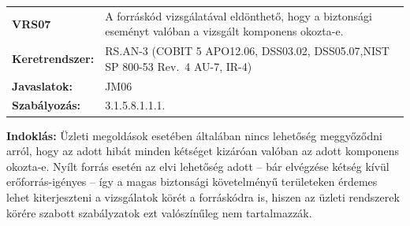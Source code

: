 \documentclass[12pt,magyar,a4paper,oneside]{scrreprt}
\begin{document}
\begin{longtable}[]{@{}ll@{}}
\toprule
\endhead
\begin{minipage}[t]{0.16\columnwidth}\raggedright
\textbf{VRS07}\strut
\end{minipage} & \begin{minipage}[t]{0.79\columnwidth}\raggedright
A forráskód vizsgálatával eldönthető, hogy a biztonsági eseményt valóban
a vizsgált komponens okozta-e.\strut
\end{minipage}\tabularnewline
\begin{minipage}[t]{0.16\columnwidth}\raggedright
\textbf{Keretrendszer:}\strut
\end{minipage} & \begin{minipage}[t]{0.79\columnwidth}\raggedright
RS.AN-3 (COBIT 5 APO12.06, DSS03.02, DSS05.07,NIST SP 800-53 Rev.~4
AU-7, IR-4)\strut
\end{minipage}\tabularnewline
\begin{minipage}[t]{0.16\columnwidth}\raggedright
\textbf{Javaslatok:}\strut
\end{minipage} & \begin{minipage}[t]{0.79\columnwidth}\raggedright
JM06\strut
\end{minipage}\tabularnewline
\begin{minipage}[t]{0.16\columnwidth}\raggedright
\textbf{Szabályozás:}\strut
\end{minipage} & \begin{minipage}[t]{0.79\columnwidth}\raggedright
3.1.5.8.1.1.1.\strut
\end{minipage}\tabularnewline
\bottomrule
\end{longtable}

\textbf{Indoklás: } Üzleti megoldások esetében általában nincs lehetőség
meggyőződni arról, hogy az adott hibát minden kétséget kizáróan valóban
az adott komponens okozta-e. Nyílt forrás esetén az elvi lehetőség adott
-- bár elvégzése kétség kívül erőforrás-igényes -- így a magas
biztonsági követelményű területeken érdemes lehet kiterjeszteni a
vizsgálatok körét a forráskódra is, hiszen az üzleti rendszerek körére
szabott szabályzatok ezt valószínűleg nem tartalmazzák.
\end{document}
